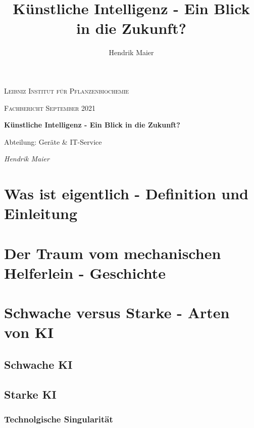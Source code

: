 \documentclass[12pt,german,ngerman]{report}
\title{Künstliche Intelligenz - Ein Blick in die Zukunft?}
\author{Hendrik Maier}
\date{}
\begin{document}
    \begin{titlepage}
        \centering
        {\scshape\LARGE Leibniz Institut für Pflanzenbiochemie\par}
        \vspace{1cm}
        {\scshape\Large Fachbericht September 2021\par}
        \vspace{1.5cm}
        {\huge\bfseries Künstliche Intelligenz - Ein Blick in die Zukunft?\par}
        \vspace{2cm}
        {\Large Abteilung: Geräte \& IT-Service\par}
        \vspace{1.5cm}
        {\Large\itshape Hendrik Maier\par}
        \vfill

    \end{titlepage}

    \tableofcontents
    \newpage

\chapter{Was ist eigentlich  - Definition und Einleitung}

\chapter{Der Traum vom mechanischen Helferlein - Geschichte}

\chapter{Schwache versus Starke - Arten von KI}
    \section{Schwache KI}
        \subsection{}
    \section{Starke KI}
        \subsection{Technolgische Singularität}
\end{document}
